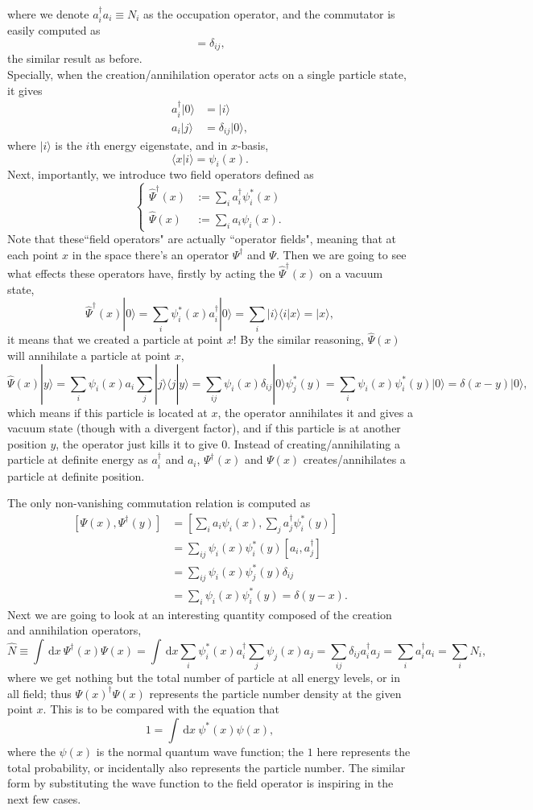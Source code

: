 \documentclass{article}
\newcommand{\be}{\begin{equation}}
\newcommand{\ee}{\end{equation}}
\newcommand{\dif}{\,\mathrm{d}}
\renewcommand{\1}{\left}
\renewcommand{\2}{\right}
\newcommand{\la}{\langle}
\newcommand{\ra}{\rangle}
\newcommand{\del}{\delta}
\begin{document}
where we denote $a_i^\dag a_i\equiv N_i$ as the occupation operator, and the commutator is easily computed as
\be
[a_i,a_j^\dag]=\del_{ij},
\ee
the similar          result as before.\\
Specially, when the creation/annihilation operator acts on a single particle state, it gives 
\be\begin{split}
a_i^\dag|0\ra&=|i\ra\\
a_i|j\ra&=\del_{ij}|0\ra,
\end{split}\ee
where $|i\ra$ is the $i$th energy eigenstate, and in $x$-basis,
\be
\la x|i\ra=\psi_i(x).
\ee
Next, importantly, we introduce two field operators defined as 
\be\1\{\begin{split}
\hat\Psi^\dag(x)&:=\sum_i a_i^\dag\psi_i^*(x) \\
\hat\Psi(x)&:=\sum_i  a_i\psi_i(x).
\end{split}\2.\ee
Note that these``field operators" are actually ``operator fields", meaning that at each point $x$ in the space there's an operator $\Psi^\dag$ and $\Psi$. Then we are going to see what effects these operators have, firstly by acting the $\hat\Psi^\dag(x)$ on a vacuum state,
\be
\hat\Psi^\dag(x)|0\ra=\sum_i  \psi_i^*(x)a_i^\dag|0\ra=\sum_i |i\ra\la i|x\ra=|x\ra,
\ee
it means that we created a particle at point $x$! By the similar reasoning, $\hat\Psi(x)$ will annihilate a particle at point $x$,
\be
\hat\Psi(x)|y\ra=\sum_i \psi_i(x)a_i \sum_j|j\ra\la j|y\ra=\sum_{ij}  \psi_i(x) \del_{ij}|0\ra\psi_j^*(y) =\sum_i  \psi_i(x) \psi_i^*(y)|0\ra=\del(x-y)|0\ra,
\ee
which means if this particle is located at $x$, the operator annihilates it and gives a vacuum state (though with a divergent factor), and if this particle is at another position $y$, the operator just kills it to give $0$. Instead of creating/annihilating a particle at definite energy as $a_i^\dag$ and $a_i$, $\Psi^\dag(x)$ and $\Psi(x)$ creates/annihilates a particle at definite position.

The only non-vanishing commutation relation is computed as
\be\begin{split}
[\Psi(x),\Psi^\dag(y)]&=\1[\sum_i a_i\psi_i(x),\sum_j a_j^\dag\psi_i^*(y)\2]\\
&=\sum_{ij}\psi_i(x)\psi_i^*(y)[a_i,a_j^\dag]\\
&=\sum_{ij}\psi_i(x)\psi_j^*(y)\del_{ij}\\
&=\sum_{i}\psi_i(x)\psi_i^*(y)=\del(y-x).
\end{split}\ee
Next we are going to look at an interesting quantity composed of the creation and annihilation operators,
\be
\hat N\equiv \int \dif x\ \Psi^\dag(x)\Psi(x)=\int \dif x \sum_i \psi_i^*(x)a_i^\dag\sum_j  \psi_j(x)a_j=\sum_{ij}\del_{ij}a_i^\dag a_j=\sum_i a_i^\dag a_i=\sum_i N_i,
\ee
where we get nothing but the total number of particle at all energy levels, or in all field; thus $\Psi(x)^\dag\Psi(x)$ represents the particle number density at the given point $x$. This is to be compared with the equation that
\be
1=\int \dif x\ \psi^*(x)\psi(x),
\ee
where the $\psi(x)$ is the normal quantum wave function; the $1$ here represents the total probability, or incidentally also represents the particle number. The similar form by substituting the wave function to the field operator is inspiring in the next few cases.
\end{document}
